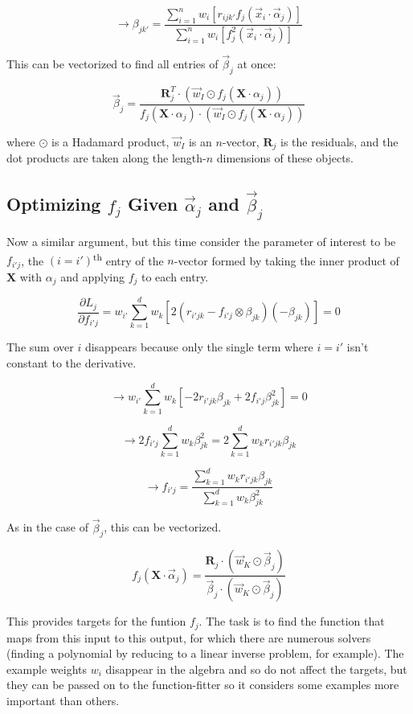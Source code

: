 \documentclass[12pt]{article}
\begin{document}
$$\rightarrow \beta_{jk'} = \frac{\sum_{i=1}^n w_i [r_{ijk'} f_j(\vec{x}_i \cdot \vec{\alpha}_j)]}{\sum_{i=1}^n w_i [f_j^2(\vec{x}_i \cdot \vec{\alpha}_j)]}$$

This can be vectorized to find all entries of $\vec{\beta}_j$ at once:

$$ \vec{\beta}_j = \frac{\pmb{R}_j^T \cdot (\vec{w}_I \odot f_j(\pmb{X} \cdot \alpha_j))}{f_j(\pmb{X} \cdot \alpha_j) \cdot (\vec{w}_I \odot f_j(\pmb{X} \cdot \alpha_j))}$$

where $\odot$ is a Hadamard product, $\vec{w}_I$ is an $n$-vector, $\pmb{R}_j$ is the residuals, and the dot products are taken along the length-$n$ dimensions of these objects.

\subsection{Optimizing $f_j$ Given $\vec{\alpha}_j$ and $\vec{\beta}_j$}

Now a similar argument, but this time consider the parameter of interest to be $f_{i'j}$, the $(i=i')$\textsuperscript{th} entry of the $n$-vector formed by taking the inner product of $\pmb{X}$ with $\alpha_j$ and applying $f_j$ to each entry.


$$\frac{\partial L_j}{\partial f_{i'j}} = w_{i'} \sum_{k=1}^d w_k [2(r_{i'jk} - f_{i'j} \otimes \beta_{jk})(-\beta_{jk})] = 0$$

The sum over $i$ disappears because only the single term where $i=i'$ isn't constant to the derivative.

$$\rightarrow w_{i'} \sum_{k=1}^d w_k [-2 r_{i'jk} \beta_{jk} + 2 f_{i'j} \beta_{jk}^2 ] = 0$$

$$\rightarrow 2 f_{i'j} \sum_{k=1}^d w_k \beta_{jk}^2 = 2 \sum_{k=1}^d w_k r_{i'jk} \beta_{jk}$$

$$\rightarrow f_{i'j} = \frac{\sum_{k=1}^d w_k r_{i'jk} \beta_{jk}}{\sum_{k=1}^d w_k \beta_{jk}^2}$$

As in the case of $\vec{\beta}_j$, this can be vectorized.

$$ f_j(\pmb{X} \cdot \vec{\alpha}_j) = \frac{\pmb{R}_j \cdot (\vec{w}_K \odot \vec{\beta}_j)}{\vec{\beta}_j \cdot (\vec{w}_K \odot \vec{\beta}_j)}$$

This provides targets for the funtion $f_j$. The task is to find the function that maps from this input to this output, for which there are numerous solvers (finding a polynomial by reducing to a linear inverse problem, for example). The example weights $w_i$ disappear in the algebra and so do not affect the targets, but they can be passed on to the function-fitter so it considers some examples more important than others.
\end{document}
